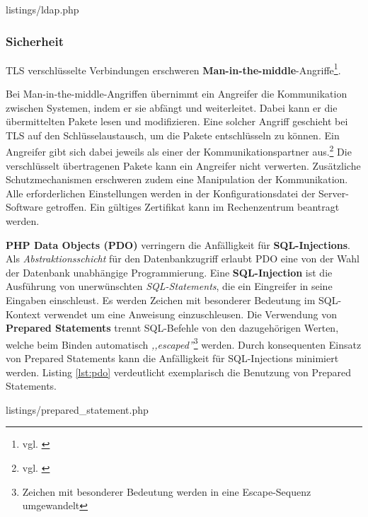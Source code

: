 \documentclass[12pt,a4paper,pointednumbers,abstracton]{scrartcl}
\begin{document}
\begin{minipage}{\textwidth}
	
	{listings/ldap.php}
\end{minipage}


\subsubsection{Sicherheit}
\label{sec:oauth-infrz/security}

TLS verschlüsselte Verbindungen erschweren \textbf{Man-in-the-middle}-Angriffe\footnote{vgl. \cite[Section 10.8]{RFC6749}}.

Bei Man-in-the-middle-Angriffen übernimmt ein Angreifer die Kommunikation zwischen Systemen, indem er sie abfängt und weiterleitet.
Dabei kann er die übermittelten Pakete lesen und modifizieren.
Eine solcher Angriff geschieht bei TLS auf den Schlüsselaustausch, um die Pakete entschlüsseln zu können.
Ein Angreifer gibt sich dabei jeweils als einer der Kommunikationspartner aus.\footnote{vgl. \cite[Section 8.7.2]{TW10}}
Die verschlüsselt übertragenen Pakete kann ein Angreifer nicht verwerten.
Zusätzliche Schutzmechanismen erschweren zudem eine Manipulation der  Kommunikation.
Alle erforderlichen Einstellungen werden in der Konfigurationsdatei der Server-Software getroffen.
Ein gültiges Zertifikat kann im Rechenzentrum beantragt werden.

\textbf{PHP Data Objects (PDO)} verringern die Anfälligkeit für \textbf{SQL-Injections}.
Als \emph{Abstraktionsschicht} für den Datenbankzugriff erlaubt PDO eine von der Wahl der Datenbank unabhängige Programmierung.
Eine \textbf{SQL-Injection} ist die Ausführung von unerwünschten \emph{SQL-Statements}, die ein Eingreifer in seine Eingaben einschleust.
Es werden Zeichen mit besonderer Bedeutung im SQL-Kontext verwendet um eine Anweisung einzuschleusen.
Die Verwendung von \textbf{Prepared Statements} trennt SQL-Befehle von den dazugehörigen Werten, welche beim Binden automatisch \emph{,,escaped''}\footnote{Zeichen mit besonderer Bedeutung werden in eine Escape-Sequenz umgewandelt} werden.
Durch konsequenten Einsatz von Prepared Statements kann die Anfälligkeit für SQL-Injections minimiert werden.
Listing \ref{lst:pdo} verdeutlicht exemplarisch die Benutzung von Prepared Statements.

\begin{minipage}{\textwidth}
	
	{listings/prepared_statement.php}
\end{minipage}
\end{document}
